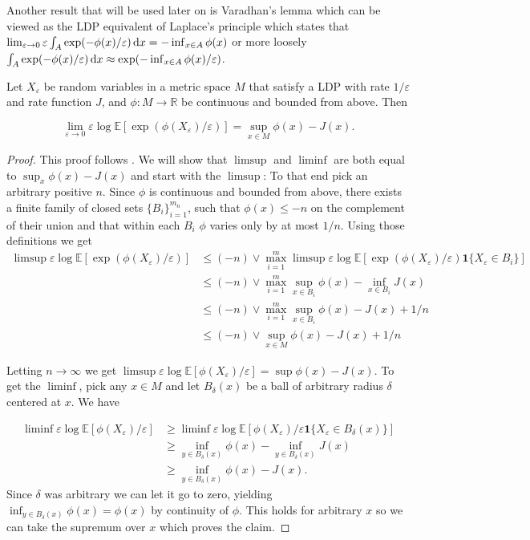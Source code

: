 Another result that will be used later on is Varadhan's lemma which can be viewed as the LDP equivalent of Laplace's principle which states that $\lim_{\varepsilon\rightarrow 0} \varepsilon \int_A \exp(-\phi(x)/\varepsilon)\mathop{}\!\mathrm{d} x = -\inf_{x\in A} \phi(x)$ or more loosely $\int_A \exp(-\phi(x)/\varepsilon)\mathop{}\!\mathrm{d} x\approx\exp(-\inf_{x\in A}\phi(x)/\varepsilon)$.
\begin{lemma}[Varadhan]
	Let $X_\varepsilon$ be random variables in a metric space $M$ that satisfy a LDP with rate $1/\varepsilon$ and rate function $J$, and $\phi:M\rightarrow\mathbb R$ be continuous and bounded from above. Then 
	
	$$\lim_{\varepsilon\rightarrow 0}\varepsilon\log\mathbb E[\exp(\phi(X_\varepsilon)/\varepsilon)]=\sup_{x\in M}\phi(x)-J(x).$$
\end{lemma}
\begin{proof}
	This proof follows \cite{scLDP}. We will show that $\limsup$ and $\liminf$ are both equal to 	$\sup_x \phi(x)-J(x)$ and start with the $\limsup$:
	To that end pick an arbitrary positive $n$. Since $\phi$ is continuous and bounded from above, there exists a finite family of closed sets $\{B_i\}_{i=1}^{m_n}$, such that $\phi(x)\leq -n$ on the complement of their union and that within each $B_i$ $\phi$ varies only by at most $1/n$.
	Using those definitions we get
	\begin{align*}
		\limsup\varepsilon\log\mathbb E[\exp(\phi(X_\varepsilon)/\varepsilon)]
		&\leq(-n)\lor\max_{i=1}^m \limsup\varepsilon\log\mathbb E[\exp(\phi(X_\varepsilon)/\varepsilon)\mathbf 1\{X_\varepsilon\in B_i\}]\\
		&\leq(-n)\lor\max_{i=1}^m\sup_{x\in B_i}\phi(x)-\inf_{x\in B_i} J(x)\\
		&\leq(-n)\lor\max_{i=1}^m\sup_{x\in B_i}\phi(x)-J(x)+1/n\\
		&\leq(-n)\lor\sup_{x\in M}\phi(x)-J(x)+1/n
	\end{align*}
	
	Letting $n\rightarrow\infty$ we get $\limsup\varepsilon\log\mathbb E[\phi(X_\varepsilon)/\varepsilon]=\sup \phi(x)-J(x)$.
	To get the $\liminf$, pick any $x\in M$ and let $B_{\delta}(x)$ be a ball of arbitrary radius $\delta$ centered at $x$.
	We have
	
	\begin{align*}
		\liminf\varepsilon\log\mathbb E[\phi(X_\varepsilon)/\varepsilon]
		&\geq\liminf\varepsilon\log\mathbb E[\phi(X_\varepsilon)/\varepsilon\mathbf 1\{X_\varepsilon\in B_\delta(x)\}]\\
		&\geq\inf_{y\in B_\delta(x)}\phi(x)-\inf_{y\in B_\delta(x)}J(x)\\
		&\geq\inf_{y\in B_\delta(x)}\phi(x)-J(x).
	\end{align*}
	Since $\delta$ was arbitrary we can let it go to zero, yielding $\inf_{y\in B_\delta(x)}\phi(x)=\phi(x)$ by continuity of $\phi$. This holds for arbitrary $x$ so we can take the supremum over $x$ which proves the claim.
\end{proof}

